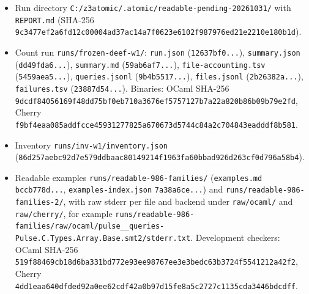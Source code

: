 \documentclass[10pt,a4paper]{article}
\begin{document}
\begin{itemize}\setlength{\itemsep}{1pt}\setlength{\parskip}{0pt}

\item Run directory \texttt{C:\allowbreak{}/\allowbreak{}z3atomic/\allowbreak{}.\allowbreak{}atomic/\allowbreak{}readable-{}\allowbreak{}pending-{}\allowbreak{}20261031/\allowbreak{}} with \texttt{REPORT.\allowbreak{}md} (SHA-256 \texttt{9c3477ef2a6fd12c\allowbreak{}00004ad37ac14a7f\allowbreak{}0623e6102f987976\allowbreak{}ed21e2210e180b1d\allowbreak{}}).

\item Count run \texttt{runs/\allowbreak{}frozen-{}\allowbreak{}deef-{}\allowbreak{}w1/\allowbreak{}}: \texttt{run.\allowbreak{}json} (\texttt{12637bf0.\allowbreak{}.\allowbreak{}.\allowbreak{}}), \texttt{summary.\allowbreak{}json} (\texttt{dd49fda6.\allowbreak{}.\allowbreak{}.\allowbreak{}}), \texttt{summary.\allowbreak{}md} (\texttt{59ab6af7.\allowbreak{}.\allowbreak{}.\allowbreak{}}), \texttt{file-{}\allowbreak{}accounting.\allowbreak{}tsv} (\texttt{5459aea5.\allowbreak{}.\allowbreak{}.\allowbreak{}}), \texttt{queries.\allowbreak{}jsonl} (\texttt{9b4b5517.\allowbreak{}.\allowbreak{}.\allowbreak{}}), \texttt{files.\allowbreak{}jsonl} (\texttt{2b26382a.\allowbreak{}.\allowbreak{}.\allowbreak{}}), \texttt{failures.\allowbreak{}tsv} (\texttt{23887d54.\allowbreak{}.\allowbreak{}.\allowbreak{}}). Binaries: OCaml SHA-256 \texttt{9dcdf84056169f48\allowbreak{}dd75bf0eb710a367\allowbreak{}6ef5757127b7a22a\allowbreak{}820b86b09b79e2fd\allowbreak{}}, Cherry \texttt{f9bf4eaa085addfc\allowbreak{}ce45931277825a67\allowbreak{}0673d5744c84a2c7\allowbreak{}04843eadddf8b581\allowbreak{}}.

\item Inventory \texttt{runs/\allowbreak{}inv-{}\allowbreak{}w1/\allowbreak{}inventory.\allowbreak{}json} (\texttt{86d257aebc92d7e5\allowbreak{}79ddbaac80149214\allowbreak{}f1963fa60bbad926\allowbreak{}d263cf0d796a58b4\allowbreak{}}).

\item Readable examples \texttt{runs/\allowbreak{}readable-{}\allowbreak{}986-{}\allowbreak{}families/\allowbreak{}} (\texttt{examples.\allowbreak{}md} \texttt{bccb778d.\allowbreak{}.\allowbreak{}.\allowbreak{}}, \texttt{examples-{}\allowbreak{}index.\allowbreak{}json} \texttt{7a38a6ce.\allowbreak{}.\allowbreak{}.\allowbreak{}}) and \texttt{runs/\allowbreak{}readable-{}\allowbreak{}986-{}\allowbreak{}families-{}\allowbreak{}2/\allowbreak{}}, with raw stderr per file and backend under \texttt{raw/\allowbreak{}ocaml/\allowbreak{}} and \texttt{raw/\allowbreak{}cherry/\allowbreak{}}, for example \texttt{runs/\allowbreak{}readable-{}\allowbreak{}986-{}\allowbreak{}families/\allowbreak{}raw/\allowbreak{}ocaml/\allowbreak{}pulse\_\allowbreak{}\_\allowbreak{}queries-{}\allowbreak{}Pulse.\allowbreak{}C.\allowbreak{}Types.\allowbreak{}Array.\allowbreak{}Base.\allowbreak{}smt2/\allowbreak{}stderr.\allowbreak{}txt}. Development checkers: OCaml SHA-256 \texttt{519f88469cb18d6b\allowbreak{}a331bd772e93ee98\allowbreak{}767ee3e3bedc63b3\allowbreak{}724f5541212a42f2\allowbreak{}}, Cherry \texttt{4dd1eaa640dfded9\allowbreak{}2a0ee62cdf42a0b9\allowbreak{}7d15fe8a5c2727c1\allowbreak{}135cda3446bdcdff\allowbreak{}}.


\end{itemize}
\end{document}
